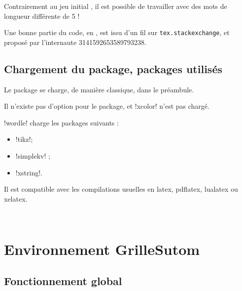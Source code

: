 \documentclass[french,a4paper,11pt]{article}
\begin{document}
{\begin{noteblock}
Contrairement au jeu \og initial \fg, il est possible de travailler avec des mots de longueur différente de 5 !
\end{noteblock}

\begin{importantblock}
Une bonne partie du code, en , est issu d'un fil sur \texttt{tex.stackexchange}, et proposé par l'internaute \textsf{3141592653589793238}.
\end{importantblock}

\subsection{Chargement du package, packages utilisés}

\begin{importantblock}
Le package se charge, de manière classique, dans le préambule.

Il n'existe pas d'option pour le package, et \packagetex!xcolor! n'est pas chargé.
\end{importantblock}


\begin{noteblock}
\packagetex!wordle! charge les packages suivants :

\begin{itemize}
	\item \packagetex!tikz!;
	\item \packagetex!simplekv! ;
	\item \packagetex!xstring!.
\end{itemize}

Il est compatible avec les compilations usuelles en \textsf{latex}, \textsf{pdflatex}, \textsf{lualatex} ou \textsf{xelatex}.
\end{noteblock}

\vfill~

\pagebreak

\section{Environnement GrilleSutom}

\subsection{Fonctionnement global}

}
\end{document}
